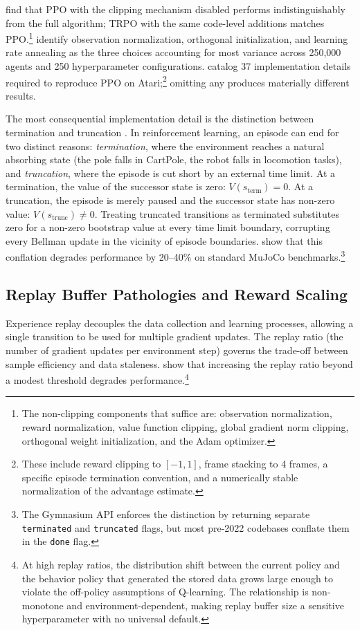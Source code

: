 \citet{Engstrom2020} find that PPO with the clipping mechanism disabled performs indistinguishably from the full algorithm; TRPO \citep{Schulman2015} with the same code-level additions matches PPO.\footnote{The non-clipping components that suffice are: observation normalization, reward normalization, value function clipping, global gradient norm clipping, orthogonal weight initialization, and the Adam optimizer.} \citet{andrychowicz2021matters} identify observation normalization, orthogonal initialization, and learning rate annealing as the three choices accounting for most variance across 250,000 agents and 250 hyperparameter configurations. \citet{huang2022ppo} catalog 37 implementation details required to reproduce PPO on Atari;\footnote{These include reward clipping to $[-1, 1]$, frame stacking to 4 frames, a specific episode termination convention, and a numerically stable normalization of the advantage estimate.} omitting any produces materially different results.

The most consequential implementation detail is the distinction between termination and truncation \citep{pardo2018time}. In reinforcement learning, an episode can end for two distinct reasons: \emph{termination}, where the environment reaches a natural absorbing state (the pole falls in CartPole, the robot falls in locomotion tasks), and \emph{truncation}, where the episode is cut short by an external time limit. At a termination, the value of the successor state is zero: $V(s_\text{term}) = 0$. At a truncation, the episode is merely paused and the successor state has non-zero value: $V(s_\text{trunc}) \neq 0$. Treating truncated transitions as terminated substitutes zero for a non-zero bootstrap value at every time limit boundary, corrupting every Bellman update in the vicinity of episode boundaries. \citet{pardo2018time} show that this conflation degrades performance by 20--40\% on standard MuJoCo benchmarks.\footnote{The Gymnasium API \citep{Towers2024} enforces the distinction by returning separate \texttt{terminated} and \texttt{truncated} flags, but most pre-2022 codebases conflate them in the \texttt{done} flag.}

\subsection{Replay Buffer Pathologies and Reward Scaling}
\label{sec:replay_reward}

Experience replay \citep{Lin1992} decouples the data collection and learning processes, allowing a single transition to be used for multiple gradient updates. The replay ratio (the number of gradient updates per environment step) governs the trade-off between sample efficiency and data staleness. \citet{Zhang2017replay} show that increasing the replay ratio beyond a modest threshold degrades performance.\footnote{At high replay ratios, the distribution shift between the current policy and the behavior policy that generated the stored data grows large enough to violate the off-policy assumptions of Q-learning. The relationship is non-monotone and environment-dependent, making replay buffer size a sensitive hyperparameter with no universal default.}

